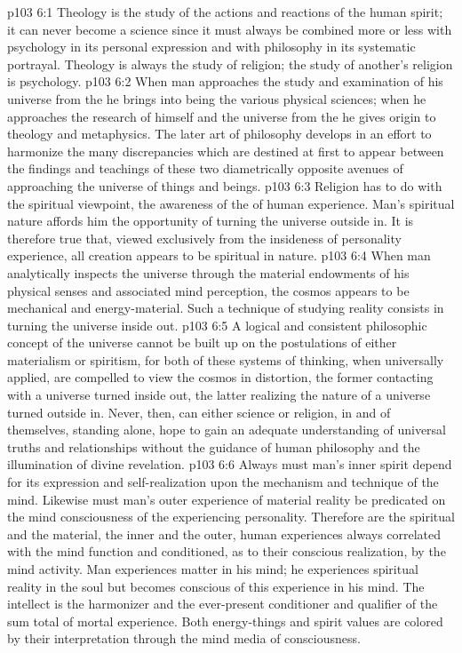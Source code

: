\vs p103 6:1 Theology is the study of the actions and reactions of the human spirit; it can never become a science since it must always be combined more or less with psychology in its personal expression and with philosophy in its systematic portrayal. Theology is always the study of  religion; the study of another’s religion is psychology.
\pc \vs p103 6:2 When man approaches the study and examination of his universe from the  he brings into being the various physical sciences; when he approaches the research of himself and the universe from the  he gives origin to theology and metaphysics. The later art of philosophy develops in an effort to harmonize the many discrepancies which are destined at first to appear between the findings and teachings of these two diametrically opposite avenues of approaching the universe of things and beings.
\vs p103 6:3 Religion has to do with the spiritual viewpoint, the awareness of the  of human experience. Man’s spiritual nature affords him the opportunity of turning the universe outside in. It is therefore true that, viewed exclusively from the insideness of personality experience, all creation appears to be spiritual in nature.
\vs p103 6:4 When man analytically inspects the universe through the material endowments of his physical senses and associated mind perception, the cosmos appears to be mechanical and energy\hyp{}material. Such a technique of studying reality consists in turning the universe inside out.
\pc \vs p103 6:5 A logical and consistent philosophic concept of the universe cannot be built up on the postulations of either materialism or spiritism, for both of these systems of thinking, when universally applied, are compelled to view the cosmos in distortion, the former contacting with a universe turned inside out, the latter realizing the nature of a universe turned outside in. Never, then, can either science or religion, in and of themselves, standing alone, hope to gain an adequate understanding of universal truths and relationships without the guidance of human philosophy and the illumination of divine revelation.
\vs p103 6:6 Always must man’s inner spirit depend for its expression and self\hyp{}realization upon the mechanism and technique of the mind. Likewise must man’s outer experience of material reality be predicated on the mind consciousness of the experiencing personality. Therefore are the spiritual and the material, the inner and the outer, human experiences always correlated with the mind function and conditioned, as to their conscious realization, by the mind activity. Man experiences matter in his mind; he experiences spiritual reality in the soul but becomes conscious of this experience in his mind. The intellect is the harmonizer and the ever\hyp{}present conditioner and qualifier of the sum total of mortal experience. Both energy\hyp{}things and spirit values are colored by their interpretation through the mind media of consciousness.
